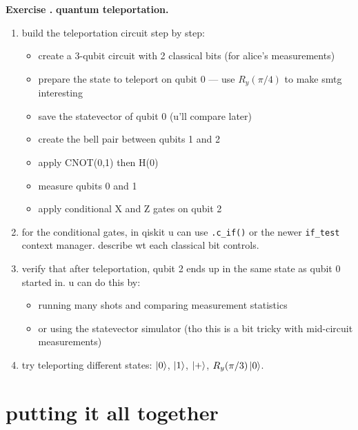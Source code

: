 \documentclass[11pt,a4paper]{article}
\theoremstyle{definition}
\theoremstyle{remark}
\newcounter{exercise}[section]
\newenvironment{exercise}{\refstepcounter{exercise}\par\medskip\noindent\textbf{Exercise \theexercise.}\rmfamily}{\medskip}
\begin{document}
\begin{exercise}
\textbf{quantum teleportation.}
\begin{enumerate}[leftmargin=*]
  \item build the teleportation circuit step by step:
    \begin{itemize}
      \item create a 3-qubit circuit with 2 classical bits (for alice's measurements)
      \item prepare the state to teleport on qubit 0 --- use $R_y(\pi/4)$ to make smtg interesting
      \item save the statevector of qubit 0 (u'll compare later)
      \item create the bell pair between qubits 1 and 2
      \item apply CNOT(0,1) then H(0)
      \item measure qubits 0 and 1
      \item apply conditional X and Z gates on qubit 2
    \end{itemize}
  \item for the conditional gates, in qiskit u can use \texttt{.c\_if()} or the newer \texttt{if\_test} context manager. describe wt each classical bit controls.
  \item verify that after teleportation, qubit 2 ends up in the same state as qubit 0 started in. u can do this by:
    \begin{itemize}
      \item running many shots and comparing measurement statistics
      \item or using the statevector simulator (tho this is a bit tricky with mid-circuit measurements)
    \end{itemize}
  \item try teleporting different states: $\ket{0}$, $\ket{1}$, $\ket{+}$, $R_y(\pi/3)\ket{0}$.
\end{enumerate}
\end{exercise}

\section{putting it all together}
\end{document}
